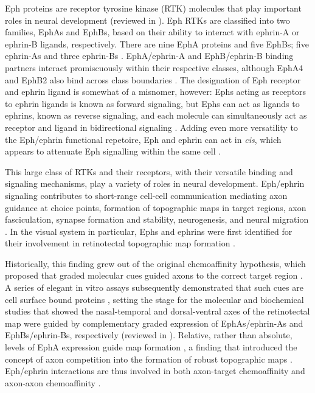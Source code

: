 Eph proteins are receptor tyrosine kinase (RTK) molecules that play important roles in neural development (reviewed in ).
Eph RTKs are classified into two families, EphAs and EphBs, based on their ability to interact with ephrin-A or ephrin-B ligands, respectively.
There are nine EphA proteins and five EphBs; five ephrin-As and three ephrin-Bs \cite{lisabeth2013eph,kania2016mechanisms}.
EphA/ephrin-A and EphB/ephrin-B binding partners interact promiscuously within their respective classes, although EphA4 and EphB2 also bind across class boundaries \cite{lisabeth2013eph,kania2016mechanisms}.
The designation of Eph receptor and ephrin ligand is somewhat of a misnomer, however: Ephs acting as receptors to ephrin ligands is known as forward signaling, but Ephs can act as ligands to ephrins, known as reverse signaling, and each molecule can simultaneously act as receptor and ligand in bidirectional signaling \cite{egea2007bidirectional,kania2016mechanisms}.
Adding even more versatility to the Eph/ephrin functional repetoire, Eph and ephrin can act in \emph{cis}, which appears to attenuate Eph signalling within the same cell \cite{marquardt2005coexpressed,carvalho2006silencing,kao2011ephrin}.

This large class of RTKs and their receptors, with their versatile binding and signaling mechanisms, play a variety of roles in neural development.
Eph/ephrin signaling contributes to short-range cell-cell communication mediating axon guidance at choice points, formation of topographic maps in target regions, axon fasciculation, synapse formation and stability, neurogenesis, and neural migration \cite{klein2014ephrin,kania2016mechanisms}.
In the visual system in particular, Ephs and ephrins were first identified for their involvement in retinotectal topographic map formation \cite{cheng1995complementary,drescher1995vitro}.

Historically, this finding grew out of the original chemoaffinity hypothesis, which proposed that graded molecular cues guided axons to the correct target region \cite{attardi1963preferential,sperry1963chemoaffinity}.
A series of elegant in vitro assays subsequently demonstrated that such cues are cell surface bound proteins \cite{walter1987recognition,walter1987avoidance,walter1990axonal}, setting the stage for the molecular and biochemical studies that showed the nasal-temporal and dorsal-ventral axes of the retinotectal map were guided by complementary graded expression of EphAs/ephrin-As and EphBs/ephrin-Bs, respectively (reviewed in ).
Relative, rather than absolute, levels of EphA expression guide map formation \cite{brown2000topographic}, a finding that introduced the concept of axon competition into the formation of robust topographic maps \cite{feldheim2010visual,triplett2012eph}.
Eph/ephrin interactions are thus involved in both axon-target chemoaffinity and axon-axon chemoaffinity \cite{weth2014chemoaffinity}.